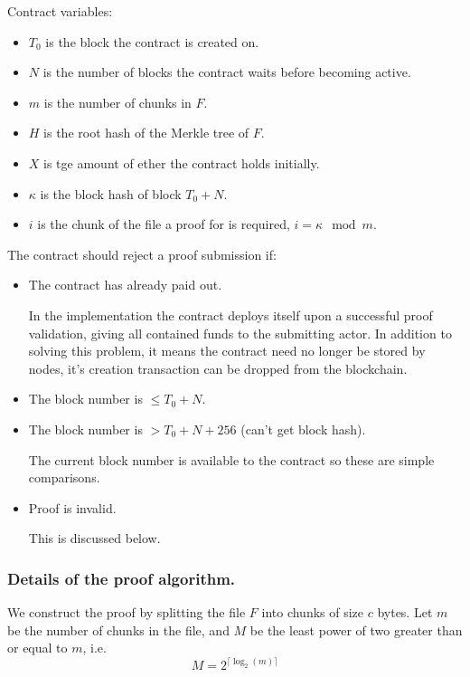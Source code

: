 \documentclass[10pt,twoside,a4paper]{article}
\begin{document}
Contract variables:

\begin{itemize}
\item $T_0$ is the block the contract is created on.
\item $N$ is the number of blocks the contract waits before becoming active.
\item $m$ is the number of chunks in $F$.
\item $H$ is the root hash of the Merkle tree of $F$.
\item $X$ is tge amount of ether the contract holds initially.
\item $\kappa$ is the block hash of block $T_0 + N$.
\item $i$ is the chunk of the file a proof for is required, $i = \kappa \mod m$.
\end{itemize}

The contract should reject a proof submission if:

\begin{itemize}
\item The contract has already paid out.

In the implementation the contract deploys itself upon a successful proof validation,
giving all contained funds to the submitting actor.
In addition to solving this problem, it means the contract need no longer be stored by nodes,
it's creation transaction can be dropped from the blockchain.

\item The block number is $\leq T_0 + N$.
\item The block number is $> T_0 + N + 256$ (can't get block hash).

The current block number is available to the contract so these are simple comparisons.

\item Proof is invalid.

This is discussed below.
\end{itemize}

\subsubsection{Details of the proof algorithm.}

We construct the proof by splitting the file $F$ into chunks of size $c$ bytes.
Let $m$ be the number of chunks in the file, and $M$ be the least power of two greater than or equal to $m$, i.e.
\[M = 2^{\lceil \log_2(m) \rceil}\]
\end{document}
